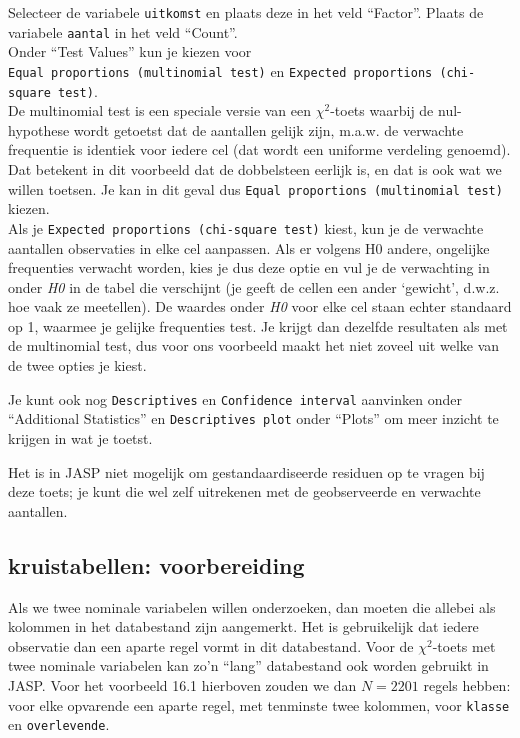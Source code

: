 \documentclass[
]{book}
\begin{document}
Selecteer de variabele \texttt{uitkomst} en plaats deze in het veld ``Factor''. Plaats de variabele \texttt{aantal} in het veld ``Count''.\\

Onder ``Test Values'' kun je kiezen voor \texttt{Equal\ proportions\ (multinomial\ test)} en \texttt{Expected\ proportions\ (chi-square\ test)}.\\
De multinomial test is een speciale versie van een \(\chi^2\)-toets waarbij de nul-hypothese wordt getoetst dat de aantallen gelijk zijn, m.a.w. de verwachte frequentie is identiek voor iedere cel (dat wordt een uniforme verdeling genoemd). Dat betekent in dit voorbeeld dat de dobbelsteen eerlijk is, en dat is ook wat we willen toetsen. Je kan in dit geval dus \texttt{Equal\ proportions\ (multinomial\ test)} kiezen.\\
Als je \texttt{Expected\ proportions\ (chi-square\ test)} kiest, kun je de verwachte aantallen observaties in elke cel aanpassen. Als er volgens H0 andere, ongelijke frequenties verwacht worden, kies je dus deze optie en vul je de verwachting in onder \emph{H0} in de tabel die verschijnt (je geeft de cellen een ander `gewicht', d.w.z. hoe vaak ze meetellen). De waardes onder \emph{H0} voor elke cel staan echter standaard op 1, waarmee je gelijke frequenties test. Je krijgt dan dezelfde resultaten als met de multinomial test, dus voor ons voorbeeld maakt het niet zoveel uit welke van de twee opties je kiest.

Je kunt ook nog \texttt{Descriptives} en \texttt{Confidence\ interval} aanvinken onder ``Additional Statistics'' en \texttt{Descriptives\ plot} onder ``Plots'' om meer inzicht te krijgen in wat je toetst.

Het is in JASP niet mogelijk om gestandaardiseerde residuen op te vragen bij deze toets; je kunt die wel zelf uitrekenen met de geobserveerde en verwachte aantallen.

\subsection{kruistabellen: voorbereiding}\label{kruistabellen-voorbereiding-1}

Als we twee nominale variabelen willen onderzoeken, dan moeten die allebei als kolommen in het databestand zijn aangemerkt.
Het is gebruikelijk dat iedere observatie dan een aparte regel vormt in dit databestand. Voor de \(\chi^2\)-toets met twee nominale variabelen kan zo'n ``lang'' databestand ook worden gebruikt in JASP. Voor het voorbeeld 16.1 hierboven zouden we dan \(N=2201\) regels hebben: voor elke opvarende een aparte regel, met tenminste twee kolommen, voor \texttt{klasse} en \texttt{overlevende}.\\
\end{document}
